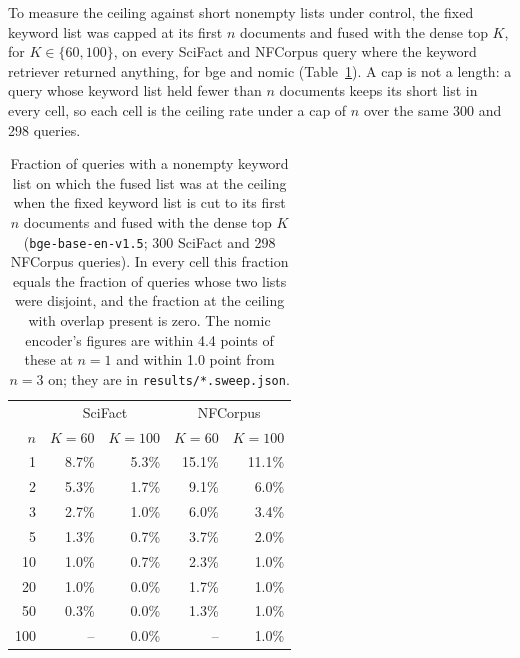 \documentclass[11pt]{article}
\begin{document}
To measure the ceiling against short nonempty lists under control, the fixed keyword list was capped at its first $n$ documents and fused with the dense top $K$, for $K \in \{60, 100\}$, on every SciFact and NFCorpus query where the keyword retriever returned anything, for bge and nomic (Table~\ref{tab:sweep}). A cap is not a length: a query whose keyword list held fewer than $n$ documents keeps its short list in every cell, so each cell is the ceiling rate under a cap of $n$ over the same 300 and 298 queries.

\begin{table}[h]
\centering
\small
\begin{tabular}{rrrrr}
\toprule
 & \multicolumn{2}{c}{SciFact} & \multicolumn{2}{c}{NFCorpus} \\
$n$ & $K=60$ & $K=100$ & $K=60$ & $K=100$ \\
\midrule
1 & 8.7\% & 5.3\% & 15.1\% & 11.1\% \\
2 & 5.3\% & 1.7\% & 9.1\% & 6.0\% \\
3 & 2.7\% & 1.0\% & 6.0\% & 3.4\% \\
5 & 1.3\% & 0.7\% & 3.7\% & 2.0\% \\
10 & 1.0\% & 0.7\% & 2.3\% & 1.0\% \\
20 & 1.0\% & 0.0\% & 1.7\% & 1.0\% \\
50 & 0.3\% & 0.0\% & 1.3\% & 1.0\% \\
100 & -- & 0.0\% & -- & 1.0\% \\
\bottomrule
\end{tabular}
\caption{Fraction of queries with a nonempty keyword list on which the fused list was at the ceiling when the fixed keyword list is cut to its first $n$ documents and fused with the dense top $K$ (\texttt{bge-base-en-v1.5}; 300 SciFact and 298 NFCorpus queries). In every cell this fraction equals the fraction of queries whose two lists were disjoint, and the fraction at the ceiling with overlap present is zero. The nomic encoder's figures are within 4.4 points of these at $n=1$ and within 1.0 point from $n=3$ on; they are in \texttt{results/*.sweep.json}.}
\label{tab:sweep}
\end{table}
\end{document}
